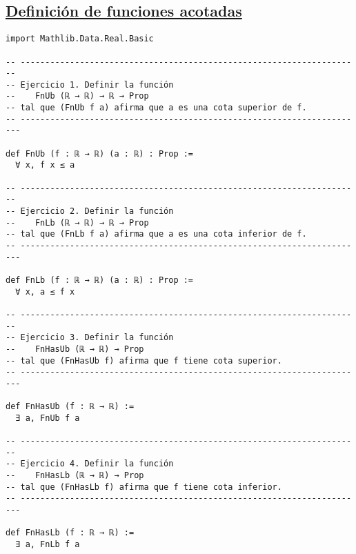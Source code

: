 \subsection{\href{./src/Logica/Definicion\_de\_funciones\_acotadas.lean}{Definición de funciones acotadas}}
\label{sec:org5c42f8b}
\begin{verbatim}
import Mathlib.Data.Real.Basic

-- ---------------------------------------------------------------------
-- Ejercicio 1. Definir la función
--    FnUb (ℝ → ℝ) → ℝ → Prop
-- tal que (FnUb f a) afirma que a es una cota superior de f.
-- ----------------------------------------------------------------------

def FnUb (f : ℝ → ℝ) (a : ℝ) : Prop :=
  ∀ x, f x ≤ a

-- ---------------------------------------------------------------------
-- Ejercicio 2. Definir la función
--    FnLb (ℝ → ℝ) → ℝ → Prop
-- tal que (FnLb f a) afirma que a es una cota inferior de f.
-- ----------------------------------------------------------------------

def FnLb (f : ℝ → ℝ) (a : ℝ) : Prop :=
  ∀ x, a ≤ f x

-- ---------------------------------------------------------------------
-- Ejercicio 3. Definir la función
--    FnHasUb (ℝ → ℝ) → Prop
-- tal que (FnHasUb f) afirma que f tiene cota superior.
-- ----------------------------------------------------------------------

def FnHasUb (f : ℝ → ℝ) :=
  ∃ a, FnUb f a

-- ---------------------------------------------------------------------
-- Ejercicio 4. Definir la función
--    FnHasLb (ℝ → ℝ) → Prop
-- tal que (FnHasLb f) afirma que f tiene cota inferior.
-- ----------------------------------------------------------------------

def FnHasLb (f : ℝ → ℝ) :=
  ∃ a, FnLb f a
\end{verbatim}


